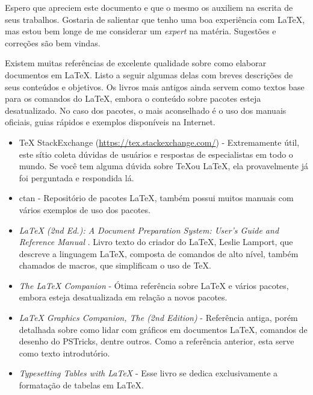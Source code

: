Espero que apreciem este documento e que o mesmo os auxiliem na escrita de seus trabalhos. Gostaria de salientar que tenho uma boa experiência com \LaTeX , mas estou bem longe de me considerar um \textit{expert} na matéria. Sugestões e correções são bem vindas.

Existem muitas referências de excelente qualidade sobre como elaborar documentos em \LaTeX . Listo a seguir algumas delas com breves descrições de seus conteúdos e objetivos. Os livros mais antigos ainda servem como textos base para os comandos do \LaTeX{}, embora o conteúdo sobre pacotes esteja desatualizado. No caso dos pacotes, o mais aconselhado é o uso dos manuais oficiais, guias rápidos e exemplos disponíveis na Internet.

\begin{itemize}
	\item \TeX{} StackExchange (\url{https://tex.stackexchange.com/}) - Extremamente útil, este sítio coleta dúvidas de usuários e respostas de especialistas em todo o mundo. Se você tem alguma dúvida sobre \TeX ou \LaTeX , ela provavelmente já foi perguntada e respondida lá.
	
	\item \gls{ctan} - Repositório de pacotes \LaTeX , também possui muitos manuais com vários exemplos de uso dos pacotes.
	
	\item \textit{\LaTeX{} (2nd Ed.): A Document Preparation System: User's Guide and Reference Manual} \parencite{Lamport1994}. Livro texto do criador do \LaTeX{}, Leslie Lamport, que descreve a linguagem \LaTeX{}, composta de comandos de alto nível, também chamados de macros, que simplificam o uso de \TeX{}.
	
	\item \textit{The \LaTeX{} Companion} \parencite{Mittelbach1999} - Ótima referência sobre \LaTeX{} e vários pacotes, embora esteja desatualizada em relação a novos pacotes.
	
	\item \textit{\LaTeX{} Graphics Companion, The (2nd Edition)} \parencite{Goosens2007} - Referência antiga, porém detalhada sobre como lidar com gráficos em documentos \LaTeX{}, comandos de desenho do PSTricks, dentre outros. Como a referência anterior, esta serve como texto introdutório. 
	
	\item \textit{Typesetting Tables with \LaTeX{}} \parencite{Voss2011} - Esse livro se dedica exclusivamente a formatação de tabelas em \LaTeX{}.
	

\end{itemize}
